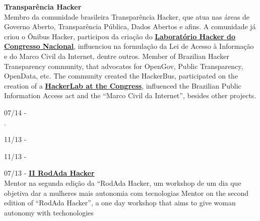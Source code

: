 \documentclass[]{friggeri-cv}
\begin{document}
\textbf{Transparência Hacker }\\
%
{Membro da comunidade brasileira Transparência Hacker, que atua nas áreas de Governo Aberto, Transparência Pública, Dados Abertos e afins. A comunidade já criou o Ônibus Hacker, participou da criação do \href{http://blog.openingparliament.org/post/72099651071/a-permanent-hacker-space-in-the-brazilian-congress}{\textbf{Laboratório Hacker do Congresso Nacional}}, influenciou na formulação da Lei de Acesso à Informação e do Marco Civil da Internet, dentre outros.}%
{Member of Brazilian Hacker Transparency community, that advocates for OpenGov, Public Transparency, OpenData, etc. The community created the HackerBus, participated on the creation of a \href{http://blog.openingparliament.org/post/72099651071/a-permanent-hacker-space-in-the-brazilian-congress}{\textbf{HackerLab at the Congress}}, influenced the Brazilian Public Information Access act and the ``Marco Civil da Internet'', besides other projects.}

07/14 - \href{http://abraji.org.br/congresso/}{\textbf{}}\\
.

11/13 - \href{https://knightcenter.utexas.edu/pt-br/blog/00-14390-inscricoes-abertas-para-primeiro-curso-da-anj-com-o-centro-knight-introducao-ao-jornal}{\textbf{}}\\

11/13 - \href{http://2.encontro.dados.gov.br/encontro.html}{\textbf{}}\\

07/13 - \href{http://rodadahacker.com/}{\textbf{II RodAda Hacker}}\\
%
{Mentor na segunda edição da ``RodAda Hacker, um workshop de um dia que objetiva dar a mulheres mais autonomia com tecnologias}%
{Mentor on the second edition of ``RodAda Hacker'', a one day workshop that aims to give woman autonomy with techonologies}
\end{document}
